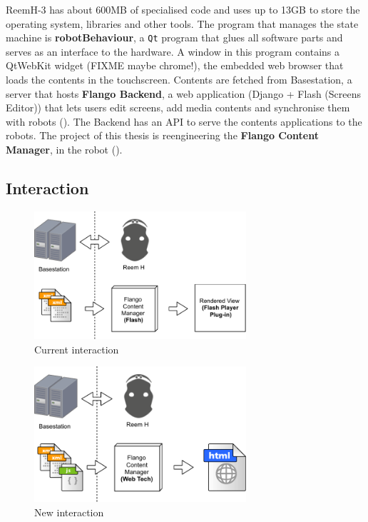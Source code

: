 ReemH-3 has about 600MB of specialised code and uses up to 13GB to store the operating system, libraries and other tools.
The program that manages the state machine is \textbf{robotBehaviour}, a \texttt{Qt} program that glues all software parts and serves as an interface to the hardware.
A window in this program contains a QtWebKit widget (FIXME maybe chrome!), the embedded web browser that loads the contents in the touchscreen.
Contents are fetched from Basestation, a server that hosts \textbf{Flango Backend}, a web application (Django + Flash (Screens Editor)) that lets users edit screens, add media contents and synchronise them with robots ().
The Backend has an \ac{API} to serve the contents applications to the robots.
The project of this thesis is reengineering the \textbf{Flango Content Manager}, in the robot ().

\subsection{Interaction}
\begin{figure}[htb]
    \centering
    \includegraphics[width=0.7\textwidth]{figures/interaction-original}
    \caption{Current interaction}
    \label{fig:interaction-original}
\end{figure}

\begin{figure}[htb]
    \centering
    \includegraphics[width=0.7\textwidth]{figures/interaction-new}
    \caption{New interaction}
    \label{fig:interaction-new}
\end{figure}

